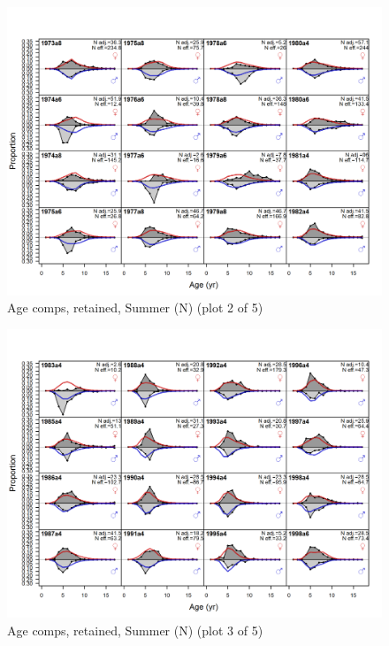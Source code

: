 \documentclass[12pt,]{article}
\begin{document}
\begin{figure}
\centering
\includegraphics{r4ss/plots_mod1/comp_agefit_flt2mkt2_page2.png}
\caption{Age comps, retained, Summer (N) (plot 2 of 5)
\label{fig:age_fits}}
\end{figure}

\begin{figure}
\centering
\includegraphics{r4ss/plots_mod1/comp_agefit_flt2mkt2_page3.png}
\caption{Age comps, retained, Summer (N) (plot 3 of 5)
\label{fig:age_fits}}
\end{figure}
\end{document}
